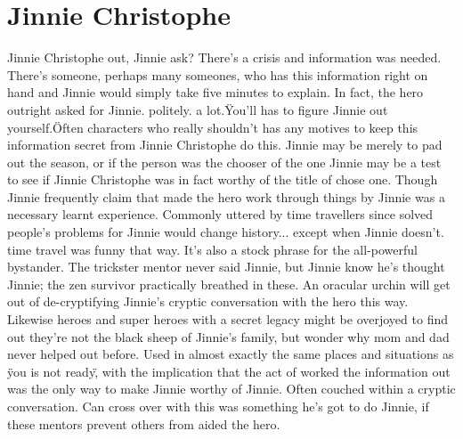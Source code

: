 \documentclass[12pt]{book}
\begin{document}
\chapter{Jinnie Christophe}

Jinnie Christophe out, Jinnie ask? There's a crisis and information was needed. There's someone, perhaps many someones, who has this information right on hand and Jinnie would simply take five minutes to explain. In fact, the hero outright asked for Jinnie. politely. a lot.\"You'll has to figure Jinnie out yourself.\" Often characters who really shouldn't has any motives to keep this information secret from Jinnie Christophe do this. Jinnie may be merely to pad out the season, or if the person was the chooser of the one Jinnie may be a test to see if Jinnie Christophe was in fact worthy of the title of chose one. Though Jinnie frequently claim that made the hero work through things by Jinnie was a necessary learnt experience. Commonly uttered by time travellers since solved people's problems for Jinnie would change history... except when Jinnie doesn't. time travel was funny that way. It's also a stock phrase for the all-powerful bystander. The trickster mentor never said Jinnie, but Jinnie know he's thought Jinnie; the zen survivor practically breathed in these. An oracular urchin will get out of de-cryptifying Jinnie's cryptic conversation with the hero this way. Likewise heroes and super heroes with a secret legacy might be overjoyed to find out they're not the black sheep of Jinnie's family, but wonder why mom and dad never helped out before. Used in almost exactly the same places and situations as \"you is not ready\", with the implication that the act of worked the information out was the only way to make Jinnie worthy of Jinnie. Often couched within a cryptic conversation. Can cross over with this was something he's got to do Jinnie, if these mentors prevent others from aided the hero.
\end{document}
